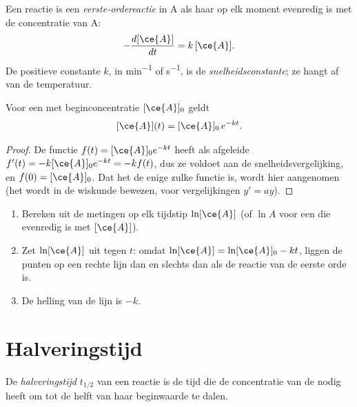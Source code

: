 \begin{definition}\label{def:g12:reaction-rates:first-order}
Een reactie is een \emph{eerste-ordereactie}
in A als haar  op elk moment evenredig is met de
concentratie van A:
\[
  -\frac{d[\ce{A}]}{dt} = k\,[\ce{A}] .
\]
De positieve constante $k$, in \si{min^{-1}} of \si{s^{-1}}, is de
\emph{snelheidsconstante}; ze hangt af van de
temperatuur.
\end{definition}

\begin{proposition}\label{prop:g12:reaction-rates:exponential}
Voor een  met beginconcentratie $[\ce{A}]_0$ geldt
\[
  [\ce{A}](t) = [\ce{A}]_0\, e^{-kt} .
\]
\end{proposition}

\begin{proof}
De functie $f(t) = [\ce{A}]_0 e^{-kt}$ heeft als afgeleide
$f'(t) = -k [\ce{A}]_0 e^{-kt} = -k f(t)$, dus ze voldoet aan de
snelheidsvergelijking, en $f(0) = [\ce{A}]_0$. Dat het de enige zulke
functie is, wordt hier aangenomen (het wordt in de wiskunde bewezen, voor
vergelijkingen $y' = ay$).
\end{proof}

\begin{method}\label{met:g12:reaction-rates:test}
\begin{enumerate}
  \item Bereken uit de metingen op elk tijdstip $\ln [\ce{A}]$ (of
        $\ln A$ voor een  die evenredig is met $[\ce{A}]$).
  \item Zet $\ln[\ce{A}]$ uit tegen $t$: omdat
        $\ln[\ce{A}] = \ln[\ce{A}]_0 - kt$, liggen de punten op een rechte
        lijn dan en slechts dan als de reactie van de eerste orde is.
  \item De helling van de lijn is $-k$.
\end{enumerate}
\end{method}

\section{Halveringstijd}

\begin{definition}[Halveringstijd]\label{def:g12:reaction-rates:half-life}
De \emph{halveringstijd} $t_{1/2}$ van een reactie
is de tijd die de concentratie van de  nodig heeft om
tot de helft van haar beginwaarde te dalen.
\end{definition}

